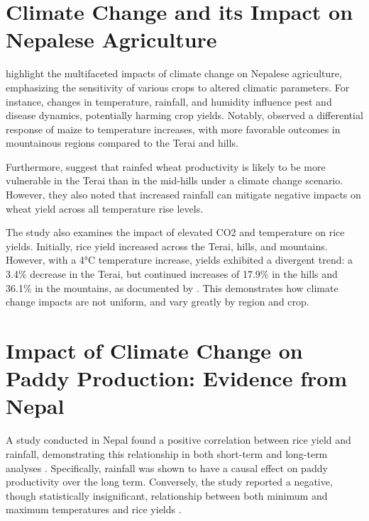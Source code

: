 \documentclass[a4paper,12pt]{article}
\begin{document}
\section{Climate Change and its Impact on Nepalese Agriculture}
\parencite{mallaClimateChangeIts2009}

\parencite{mallaClimateChangeIts2009} highlight the multifaceted impacts of climate change on Nepalese agriculture, emphasizing the sensitivity of various crops to altered climatic parameters. For instance, changes in temperature, rainfall, and humidity influence pest and disease dynamics, potentially harming crop yields. Notably, \parencite{mallaClimateChangeIts2009} observed a differential response of maize to temperature increases, with more favorable outcomes in mountainous regions compared to the Terai and hills.

Furthermore, \parencite{mallaClimateChangeIts2009} suggest that rainfed wheat productivity is likely to be more vulnerable in the Terai than in the mid-hills under a climate change scenario. However, they also noted that increased rainfall can mitigate negative impacts on wheat yield across all temperature rise levels.

The study also examines the impact of elevated CO2 and temperature on rice yields. Initially, rice yield increased across the Terai, hills, and mountains. However, with a 4°C temperature increase, yields exhibited a divergent trend: a 3.4\% decrease in the Terai, but continued increases of 17.9\% in the hills and 36.1\% in the mountains, as documented by \parencite{mallaClimateChangeIts2009}. This demonstrates how climate change impacts are not uniform, and vary greatly by region and crop.

\section{Impact of Climate Change on Paddy Production: Evidence from Nepal}
\parencite{pokharauniversitynepalImpactClimateChange2020}
A study conducted in Nepal found a positive correlation between rice yield and rainfall, demonstrating this relationship in both short-term and long-term analyses . Specifically, rainfall was shown to have a causal effect on paddy productivity over the long term. Conversely, the study reported a negative, though statistically insignificant, relationship between both minimum and maximum temperatures and rice yields .
\end{document}
